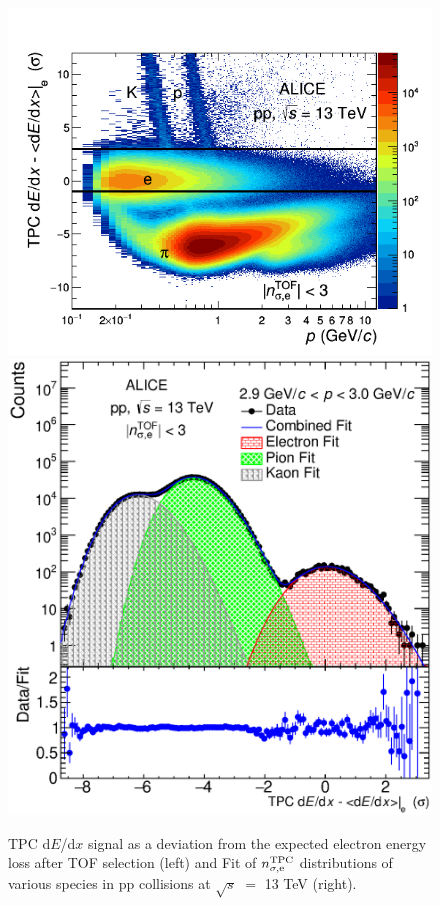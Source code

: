\begin{figure}[h!]
    \includegraphics[scale = 0.46]{figures/Results/HFE_pp_LowB/TPCQA_LowB.png}
    \includegraphics[scale = 0.35]{figures/Results/HFE_pp_LowB/TPCNsigma29to30_New.eps}
    \caption{TPC d$E$/d$x$ signal as a deviation from the expected electron energy loss after TOF selection (left) and Fit of $n^{\rm{TPC}}_{\sigma,\rm{e}}$ distributions of various species in pp collisions at $\sqrt{s}$ $=$ 13 TeV (right).} %
    \label{fig:pp_13_TPCNsigma}
\end{figure}

